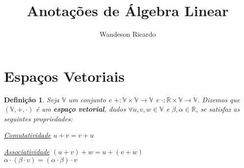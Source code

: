 \documentclass[12pt,a4paper]{article}
\title{Anotações de Álgebra Linear}
\author{Wandeson Ricardo}
\newtheorem{definicao}{Definição}
\begin{document}
\maketitle

\section{Espaços Vetoriais}

\begin{definicao}
	Seja $\mathbb{V}$ um conjunto e $+: \mathbb{V}\times\mathbb{V} \rightarrow \mathbb{V}$ e $\cdot : \mathbb{R} \times \mathbb{V} \rightarrow \mathbb{V}$. Dizemos que $(\mathbb{V}, +, \cdot )$ é um \textbf{\textit{espaço vetorial}}, dados $\forall u,v,w \in \mathbb{V}$ e $\beta, \alpha \in \mathbb{R}$, se satisfaz as seguintes propriedades:\\
	
	\item \underline{Comutatividade} $u + v = v + u$\\
	\item  \underline{Associatividade} $( u + v ) + w = u + (v + w)$\\
										$\alpha \cdot (\beta \cdot v)  = (\alpha \cdot \beta)\cdot  v$
	\item \underline{}
\end{definicao}
	
\end{document}
